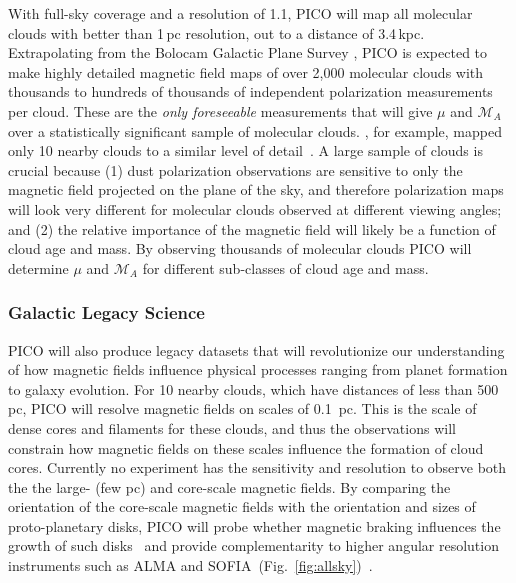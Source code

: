 \documentclass[PICOReport.tex]{subfiles}
\begin{document}
With full-sky coverage and a resolution of 1.1\arcmin, PICO will map all molecular clouds with better than 1\,pc resolution, out to a distance of 3.4\,kpc.  Extrapolating from the Bolocam Galactic Plane Survey \citep[BGPS,][]{EllsworthBowers2015}, PICO is expected to make highly detailed magnetic field maps of over 2,000 molecular clouds with thousands to hundreds of thousands of independent polarization measurements per cloud. These are the {\it only foreseeable} measurements that will give $\mu$ and $\mathcal{M}_A$ over a statistically significant sample of molecular clouds. \planck , for example, mapped only 10 nearby clouds to a similar level of detail~\citep{Planck:XXXV}. A large sample of clouds is crucial because (1) dust polarization observations are sensitive to only the magnetic field projected on the plane of the sky, and therefore polarization maps will look very different for molecular clouds observed at different viewing angles; and (2) the relative importance of the magnetic field will likely be a function of cloud age and mass. By observing thousands of molecular clouds PICO will determine $\mu$ and  $\mathcal{M}_A$ for different sub-classes of cloud age and mass. 

\subsubsection{Galactic Legacy Science}
\label{sec:galactic_legacy}

PICO will also produce legacy datasets that will revolutionize our understanding of how magnetic fields influence physical processes ranging from planet formation to galaxy evolution.  For 10 nearby clouds, which have distances of less than 500 pc, PICO will resolve magnetic fields on scales of 0.1~pc. This is the scale of dense cores and filaments for these clouds, and thus the observations will constrain how magnetic fields on these scales influence the formation of cloud cores.  Currently no experiment has the sensitivity and resolution to observe both the the large- (few pc) and core-scale magnetic fields. By comparing the orientation of the core-scale magnetic fields with the orientation and sizes of proto-planetary disks, PICO will probe whether magnetic braking influences the growth of such disks~\citep{allen_2003,li_2014} and provide complementarity to higher angular resolution instruments such as ALMA and SOFIA~(Fig.~\ref{fig:allsky})~\citep{Bacciotti2018ApJ,Harper2018}.
\end{document}
